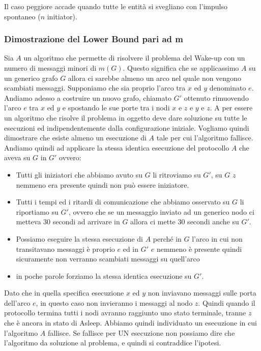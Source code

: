 Il caso peggiore accade quando tutte le entità si svegliano con l'impulso
spontaneo ($n$ initiator).

\subsubsection{Dimostrazione del Lower Bound pari ad m}
Sia $A$ un algoritmo che permette di risolvere il problema del Wake-up con un
numero di messaggi minori di $m(G)$. Questo significa che se applicassimo $A$ su un
generico grafo $G$ allora ci sarebbe almeno un arco nel quale non vengono
scambiati messaggi. Supponiamo che sia proprio l'arco tra $x$ ed $y$ denominato
$e$. Andiamo adesso a costruire un nuovo grafo, chiamato $G'$ ottenuto
rimuovendo l'arco $e$ tra $x$ ed $y$ e spostando le sue porte tra i nodi $x$ e $z$ e
$y$ e $z$. A per essere un algoritmo che risolve il problema in oggetto deve
dare soluzione su tutte le esecuzioni ed indipendentemente dalla configurazione
iniziale. Vogliamo quindi dimostrare che esiste almeno un esecuzione di $A$ tale
per cui l'algoritmo fallisce. Andiamo quindi ad applicare la stessa identica
esecuzione del protocollo $A$ che aveva su $G$ in $G'$ ovvero:
\begin{itemize}
    \item Tutti gli iniziatori che abbiamo avuto su $G$ li ritroviamo su $G'$,
          su $G$ $z$ nemmeno era presente quindi non può essere iniziatore.
    \item Tutti i tempi ed i ritardi di comunicazione che abbiamo osservato su
          $G$ li riportiamo su $G'$, ovvero che se un messaggio inviato ad un
          generico nodo ci metteva 30 secondi ad arrivare in $G$ allora ci mette
          30 secondi anche su $G'$.
    \item Possiamo eseguire la stessa esecuzione di $A$ perché in $G$ l'arco in
          cui non transitavano messaggi è proprio $e$ ed in $G'$ $e$ nemmeno è
          presente quindi sicuramente non verranno scambiati messaggi su
          quell'arco
    \item in poche parole forziamo la stessa identica esecuzione su $G'$.
\end{itemize}
Dato che in quella specifica esecuzione $x$ ed $y$ non inviavano messaggi sulle
porta dell'arco $e$, in questo caso non invieranno i messaggi al nodo $z$.
Quindi quando il protocollo termina tutti i nodi avranno raggiunto uno stato
terminale, tranne $z$ che è ancora in stato di Asleep. Abbiamo quindi
individuato un esecuzione in cui l'algoritmo $A$ fallisce. Se fallisce per UN
esecuzione non possiamo dire che l'algoritmo da soluzione al problema, e quindi
si contraddice l'ipotesi.\\

